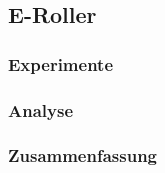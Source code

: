 \subsection{E-Roller}
\subsubsection{Experimente}
\subsubsection{Analyse}
\subsubsection{Zusammenfassung}


